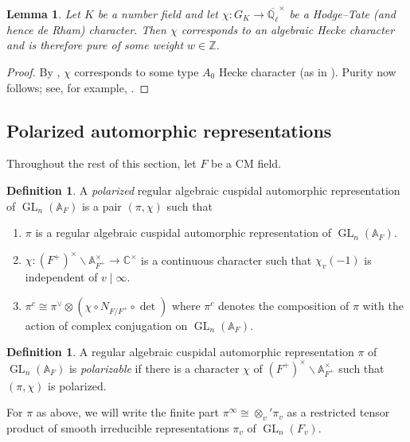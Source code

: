 \documentclass{amsart}
\newtheorem{lemma}[theorem]{Lemma}
\theoremstyle{definition}
\newtheorem{definition}[theorem]{Definition}
\numberwithin{equation}{section} %
\newcommand{\GL}{\operatorname{GL}}
\newcommand{\Qlbar}{\ensuremath{\overline{\mathbb{Q}_\ell}}}
\newcommand{\bb}[1]{\mathbb{#1}}
\begin{document}
\begin{lemma} \label{lemma: HT chars are pure}
Let $K$ be a number field and let $\chi: G_K \to \Qlbar^\times$ be a Hodge--Tate (and hence de Rham) character.
Then $\chi$ corresponds to an algebraic Hecke character and is therefore pure of some weight $w \in \bb{Z}$.
\end{lemma}
\begin{proof}
By \cite[Theorem 2.3.13]{patrikis2019variations}, $\chi$ corresponds to some type $A_0$ Hecke character (as in \cite[Definition 2.3.2]{patrikis2019variations}).
Purity now follows; see, for example, \cite[Lemma 1.9]{fargues2006motives}.
\end{proof}

\subsection{Polarized automorphic representations}

Throughout the rest of this section, let \( F \) be a CM field.
\begin{definition}
    A \emph{polarized} regular algebraic cuspidal automorphic representation of \( \GL_n(\bb{A}_F) \) is a pair \( (\pi,\chi) \) such that
    \begin{enumerate}
        \item \( \pi \) is a regular algebraic cuspidal automorphic representation of \( \GL_n(\bb{A}_F) \).
        \item \( \chi: (F^+)^\times\backslash \bb{A}_{F^+}^\times\to\bb{C}^\times \) is a continuous character such that \( \chi_v(-1) \) is independent of \( v\mid \infty \).
        \item \( \pi^c \cong \pi^\vee\otimes (\chi\circ N_{F/F^+}\circ\det) \) where \( \pi^c \) denotes the composition of \( \pi \) with the action of complex conjugation on \( \GL_n(\bb{A}_F) \).
    \end{enumerate}
\end{definition}

\begin{definition}
    A regular algebraic cuspidal automorphic representation \( \pi \) of \( \GL_n(\bb{A}_F) \) is \emph{polarizable} if there is a character \( \chi \) of \( (F^+)^\times\backslash\bb{A}_{F^+}^\times \) such that \( (\pi,\chi) \) is polarized.
\end{definition}

For $\pi$ as above, we will write the finite part $\pi^\infty \cong \otimes_{v}' \pi_v$ as a restricted tensor product of smooth irreducible representations $\pi_v$ of $\GL_n(F_v)$.
\end{document}
